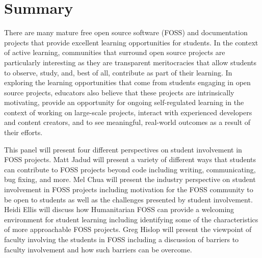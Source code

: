 \documentclass{sig-alternate}
\begin{document}
\begin{comment} 

	\end{comment}
	
                
\maketitle



\section{Summary}
There are many mature free open source software (FOSS) and documentation projects that provide excellent learning opportunities for students.  In the context of active learning, communities that surround open source projects are particularly interesting as they are transparent meritocracies that allow students to observe, study, and, best of all, contribute as part of their learning.  In exploring the learning opportunities that come from students engaging in open source projects, educators also believe that these projects are intrinsically motivating, %
provide an opportunity for ongoing self-regulated learning in the context of working on large-scale projects, %
 interact with experienced developers and content creators, and to see meaningful, real-world outcomes as a result of their efforts.

This panel will present four different perspectives on student involvement in FOSS projects. Matt Jadud will present a variety of different ways that students can contribute to FOSS projects beyond code including writing, communicating, bug fixing, and more. Mel Chua will present the industry perspective on student involvement in FOSS projects including motivation for the FOSS community to be open to students as well as the challenges presented by student involvement. Heidi Ellis will discuss how Humanitarian FOSS can provide a welcoming environment for student learning including identifying some of the characteristics of more approachable FOSS projects. Greg Hislop will present the viewpoint of faculty involving the students in FOSS including a discussion of barriers to faculty involvement and how such barriers can be overcome. 
\end{document}

